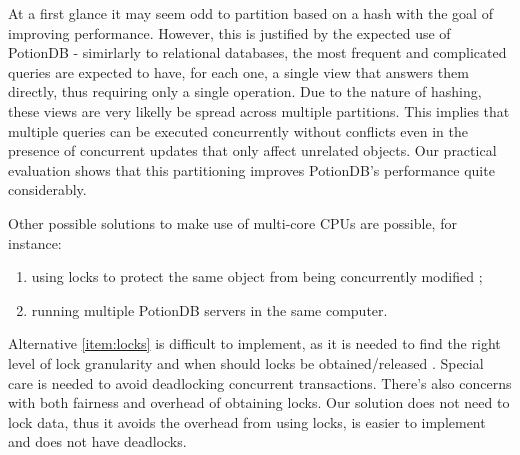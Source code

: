 \documentclass{vldb}
\begin{document}
At a first glance it may seem odd to partition based on a hash with the goal of improving performance.
However, this is justified by the expected use of PotionDB - simirlarly to relational databases, the most frequent and complicated queries are expected to have, for each one, a single view that answers them directly, thus requiring only a single operation.
Due to the nature of hashing, these views are very likelly be spread across multiple partitions.
This implies that multiple queries can be executed concurrently without conflicts even in the presence of concurrent updates that only affect unrelated objects.
Our practical evaluation shows that this partitioning improves PotionDB's performance quite considerably. %

Other possible solutions to make use of multi-core CPUs are possible, for instance:
\begin{enumerate}
	\item \label{item:locks} using locks to protect the same object from being concurrently modified \cite{???};
	\item \label{item:multiplePotion} running multiple PotionDB servers in the same computer.
\end{enumerate}


Alternative \ref{item:locks} is difficult to implement, as it is needed to find the right level of lock granularity and when should locks be obtained/released \cite{???}. 
Special care is needed to avoid deadlocking concurrent transactions. 
There's also concerns with both fairness and overhead of obtaining locks.
Our solution does not need to lock data, thus it avoids the overhead from using locks, is easier to implement and does not have deadlocks.
\end{document}
